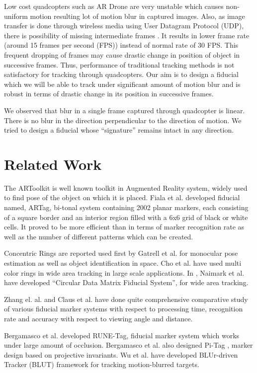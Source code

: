 \documentclass[runningheads]{llncs}
\begin{document}
Low cost quadcopters such as AR Drone are very unstable which causes non-uniform
motion resulting lot of motion blur in captured images. Also, as image transfer
is done through wireless media using User Datagram Protocol (UDP), there is
possibility of missing intermediate frames . It results in lower frame rate
(around 15 frames per second (FPS)) instead of normal rate of 30 FPS. This
frequent dropping of frames may cause drastic change in position of object in
successive frames. Thus, performance of traditional tracking methods is not
satisfactory for tracking through quadcopters. Our aim is to design a fiducial
which we will be able to track under significant amount of motion blur and is
robust in terms of drastic change in its position in successive frames.

We observed that blur in a single frame captured through quadcopter is linear.
There is no blur in the direction perpendicular to the direction of motion. We
tried to design a fiducial whose ``signature'' remains intact in any direction.

 
\section{Related Work}
The ARToolkit \cite{ARToolkit02} \cite{kato-artoolkit} is well known toolkit in
Augmented Reality system, widely used to find pose of the object on which it is
placed.  Fiala et al. \cite{Fiala05} developed fiducial named, ARTag, bi-tonal
system containing 2002 planar markers, each consisting of a square border and
an interior region filled with a 6x6 grid of black or white cells. It proved to
be more efficient than \cite{ARToolkit02} in terms of marker recognition rate
as well as the number of different patterns which can be created.  

Concentric Rings are reported used first by Gatrell et al.\cite{concentric} for
monocular pose estimation as well as object identification in space. Cho et al.
\cite{Cho:2001}\cite{Cho97fastcolor} have used multi color rings in wide area
tracking in large scale applications. In \cite{NaimarkF02}, Naimark et al.
have developed ``Circular Data Matrix Fiducial System'', for wide area tracking.

Zhang el. al.\cite{Zhang:2002} and Claus et al. \cite{ClausF04} have done
quite comprehensive comparative study of various fiducial marker systems with
respect to processing time, recognition rate and accuracy with
respect to viewing angle and distance.

Bergamasco et al. \cite{runetag11} developed RUNE-Tag, fiducial marker
system which works under large amount of occlusion. Bergamasco et al. also 
designed Pi-Tag \cite{Pitag13}, marker design based on projective
invariants.
Wu et al.\cite{Wu:2011} have developed BLUr-driven Tracker (BLUT) framework for
tracking motion-blurred targets.
\end{document}
